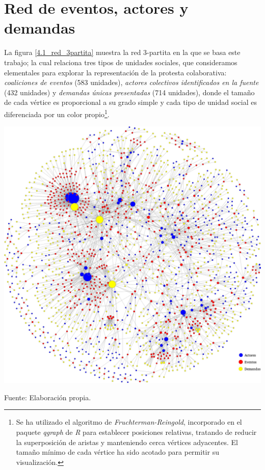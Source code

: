 \documentclass[letterpaper, 11pt]{book}
\theoremstyle{definition}
\theoremstyle{remark}
\begin{document}
\section{Red de eventos, actores y demandas}
\label{sec:RedGeneral}

La figura \ref{4.1_red_3partita} muestra la red 3-partita en la que se basa este trabajo; la cual relaciona tres tipos de unidades sociales, que consideramos elementales para explorar la representación de la protesta colaborativa: \emph{coaliciones de eventos} (583 unidades), \emph{actores colectivos identificados en la fuente} (432 unidades) y \emph{demandas únicas presentadas} (714 unidades), donde el tamaño de cada vértice es proporcional  a su grado simple y cada tipo de unidad social es diferenciada por un color propio\footnote{
    Se ha utilizado el algoritmo de \emph{Fruchterman-Reingold}, incorporado en el paquete \emph{qgraph} de \emph{R} para establecer posiciones relativas, tratando de reducir la superposición de aristas y manteniendo cerca vértices adyacentes. 
    El tamaño mínimo de cada vértice ha sido acotado para permitir su visualización. 
}. 



\hspace{-1em}\begin{minipage}{\linewidth}
\centering
{} \label{4.1_red_3partita}
\hspace{-1.6em}\includegraphics[scale=0.37]{img/4.1_red_3partita.png}
\par\bigskip
\small Fuente: Elaboración propia.
\end{minipage}\bigskip
\end{document}
